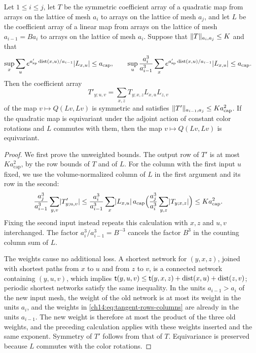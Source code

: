 \begin{lemma}\label{ch14:lem:quadratic-pullback}
Let $1\le i\le j$, let $T$ be the symmetric coefficient array of a quadratic map from arrays on the lattice of mesh $a_i$ to arrays on the lattice of mesh $a_j$, and let $L$ be the coefficient array of a linear map from arrays on the lattice of mesh $a_{i-1}=Ba_i$ to arrays on the lattice of mesh $a_i$. Suppose that $\lVert T\rVert_{a_i,a_j}\le K$ and that
\begin{equation}\label{ch14:eq:tangent-rows-columns}
 \sup_x\sum_ue^{a_{\mathrm{sp}}'\operatorname{dist}(x,u)/a_{i-1}}\lvert L_{x,u}\rvert\le a_{\mathrm{cap}},\qquad\sup_u\frac{a_i^3}{a_{i-1}^3}\sum_xe^{a_{\mathrm{sp}}'\operatorname{dist}(x,u)/a_{i-1}}\lvert L_{x,u}\rvert\le a_{\mathrm{cap}}.
\end{equation}
Then the coefficient array
\[
 T'_{y;u,v}=\sum_{x,z}T_{y;x,z}L_{x,u}L_{z,v}
\]
of the map $v\mapsto Q(Lv,Lv)$ is symmetric and satisfies $\lVert T'\rVert_{a_{i-1},a_j}\le Ka_{\mathrm{cap}}^2$. If the quadratic map is equivariant under the adjoint action of constant color rotations and $L$ commutes with them, then the map $v\mapsto Q(Lv,Lv)$ is equivariant.
\end{lemma}

\begin{proof}
We first prove the unweighted bounds. The output row of $T'$ is at most $Ka_{\mathrm{cap}}^2$, by the row bounds of $T$ and of $L$. For the column with the first input $u$ fixed, we use the volume-normalized column of $L$ in the first argument and its row in the second:
\[
 \frac{a_j^3}{a_{i-1}^3}\sum_{y,v}\lvert T'_{y;u,v}\rvert
 \le\frac{a_i^3}{a_{i-1}^3}\sum_x\lvert L_{x,u}\rvert\,a_{\mathrm{cap}}\Bigl(\frac{a_j^3}{a_i^3}\sum_{y,z}\lvert T_{y;x,z}\rvert\Bigr)
 \le Ka_{\mathrm{cap}}^2.
\]
Fixing the second input instead repeats this calculation with $x,z$ and $u,v$ interchanged. The factor $a_i^3/a_{i-1}^3=B^{-3}$ cancels the factor $B^3$ in the counting column sum of $L$.

The weights cause no additional loss. A shortest network for $(y,x,z)$, joined with shortest paths from $x$ to $u$ and from $z$ to $v$, is a connected network containing $(y,u,v)$, which implies $\mathsf t(y,u,v)\le\mathsf t(y,x,z)+\operatorname{dist}(x,u)+\operatorname{dist}(z,v)$; periodic shortest networks satisfy the same inequality. In the units $a_{i-1}>a_i$ of the new input mesh, the weight of the old network is at most its weight in the units $a_i$, and the weights in \eqref{ch14:eq:tangent-rows-columns} are already in the units $a_{i-1}$. The new weight is therefore at most the product of the three old weights, and the preceding calculation applies with these weights inserted and the same exponent. Symmetry of $T'$ follows from that of $T$. Equivariance is preserved because $L$ commutes with the color rotations.
\end{proof}

